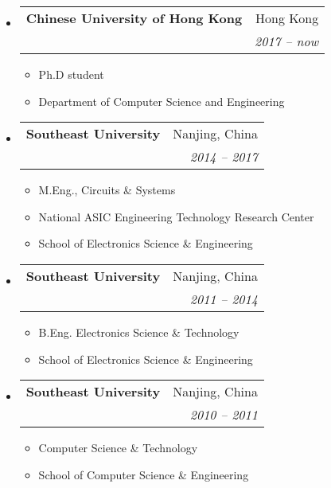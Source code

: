 \documentclass[letterpaper,11pt]{article}%
\makeatletter
\newlength{\outerbordwidth}
\newcommand{\resitem}[1]{\item #1 \vspace{-2pt}}
\newcommand{\resheading}[1]{\vspace{8pt}
  \parbox{\textwidth}{\setlength{\FrameSep}{\outerbordwidth}
    \begin{shaded}

\setlength{\fboxsep}{0pt}\framebox[\textwidth][l]{\setlength{\fboxsep}{4pt}\fcolorbox{shadecolorB}{shadecolorB}{\textbf{\sffamily{\mbox{~}\makebox[6.762in][l]{\large #1} \vphantom{p\^{E}}}}}}
    \end{shaded}
  }\vspace{-5pt}
}
\newcommand{\ressubheading}[4]{
\begin{tabular*}{6.5in}{l@{\cftdotfill{\cftsecdotsep}\extracolsep{\fill}}r}
		\textbf{#1} & #2 \\
		\textit{#3} & \textit{#4} \\
\end{tabular*}\vspace{-6pt}}
\makeatother
\begin{document}

\begin{itemize}

\item
	\ressubheading{Chinese University of Hong Kong}{Hong Kong}{}{2017 -- now}
	\begin{itemize}
		\resitem{Ph.D student}
		\resitem{Department of Computer Science and Engineering}
	\end{itemize}


\item
	\ressubheading{Southeast University}{Nanjing, China}{}{2014 -- 2017}
	\begin{itemize}
		\resitem{M.Eng., Circuits \& Systems}
		\resitem{National ASIC Engineering Technology Research Center}
		\resitem{School of Electronics Science \& Engineering}
	\end{itemize}

\item
	\ressubheading{Southeast University}{Nanjing, China}{}{2011 -- 2014}
	\begin{itemize}
		\resitem{B.Eng. Electronics Science \& Technology}
		\resitem{School of Electronics Science \& Engineering}
	\end{itemize}

\item
	\ressubheading{Southeast University}{Nanjing, China}{}{2010 --  2011}
	\begin{itemize}
		\resitem{Computer Science \& Technology}
		\resitem{School of Computer Science \& Engineering}
	\end{itemize}

\end{itemize}





\end{document}
